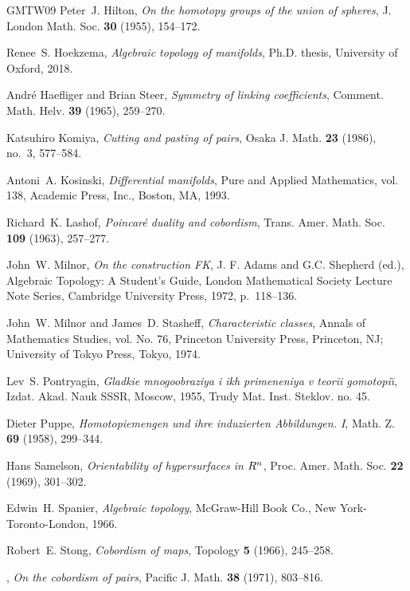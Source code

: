 \documentclass[a4paper, 11pt,reqno]{amsart}
\newcommand\cyr
{
\renewcommand\rmdefault{wncyr}
\renewcommand\sfdefault{wncyss}
\renewcommand\encodingdefault{OT2}
\normalfont
\selectfont
}
\theoremstyle{plain}
\theoremstyle{definition}
\begin{document}
\begin{thebibliography}{GMTW09}
Peter~J. Hilton, \emph{On the homotopy groups of the union of spheres}, J. London Math. Soc. \textbf{30} (1955), 154--172.

Renee~S. Hoekzema, \emph{Algebraic topology of manifolds}, Ph.D. thesis, University of Oxford, 2018.

Andr\'{e} Haefliger and Brian Steer, \emph{Symmetry of linking coefficients}, Comment. Math. Helv. \textbf{39} (1965), 259--270.

Katsuhiro Komiya, \emph{Cutting and pasting of pairs}, Osaka J. Math. \textbf{23} (1986), no.~3, 577--584.

Antoni~A. Kosinski, \emph{Differential manifolds}, Pure and Applied Mathematics, vol. 138, Academic Press, Inc., Boston, MA, 1993.

Richard~K. Lashof, \emph{Poincar\'e{} duality and cobordism}, Trans. Amer. Math. Soc. \textbf{109} (1963), 257--277.

John~W. Milnor, \emph{On the construction {FK}}, J. F. Adams and G.C. Shepherd (ed.), Algebraic Topology: A Student’s Guide, London Mathematical Society Lecture Note Series, Cambridge University Press, 1972, p.~118–136.

John~W. Milnor and James~D. Stasheff, \emph{Characteristic classes}, Annals of Mathematics Studies, vol. No. 76, Princeton University Press, Princeton, NJ; University of Tokyo Press, Tokyo, 1974.

Lev~S. Pontryagin, \emph{{\cyr Gladkie mnogoobraziya i ikh primeneniya v teorii gomotopi\u{\i}}}, Izdat. Akad. Nauk SSSR, Moscow, 1955, Trudy Mat. Inst. Steklov. no. 45.

Dieter Puppe, \emph{Homotopiemengen und ihre induzierten {A}bbildungen. {I}}, Math. Z. \textbf{69} (1958), 299--344.

Hans Samelson, \emph{Orientability of hypersurfaces in {$R\sp{n}$}}, Proc. Amer. Math. Soc. \textbf{22} (1969), 301--302.

Edwin~H. Spanier, \emph{Algebraic topology}, McGraw-Hill Book Co., New York-Toronto-London, 1966.

Robert~E. Stong, \emph{Cobordism of maps}, Topology \textbf{5} (1966), 245--258.

\bysame, \emph{On the cobordism of pairs}, Pacific J. Math. \textbf{38} (1971), 803--816.


\end{thebibliography}
\end{document}
